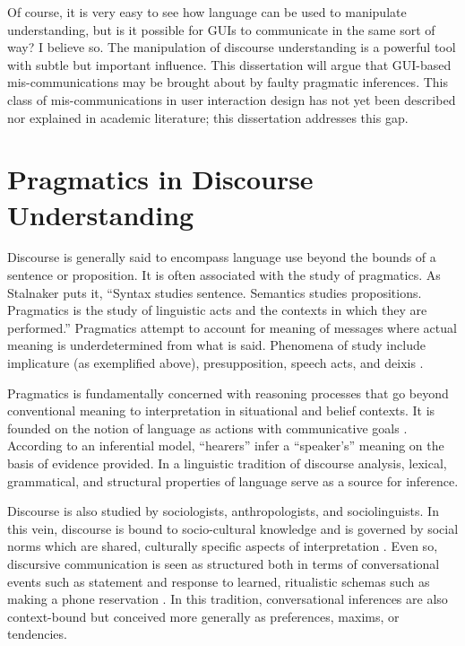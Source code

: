 Of course, it is very easy to see how language can be used to manipulate understanding, but is it possible for GUIs to communicate in the same sort of way? I believe so. The manipulation of discourse understanding is a powerful tool with subtle but important influence. This dissertation will argue that GUI-based mis-communications may be brought about by faulty pragmatic inferences. This class of mis-communications in user interaction design has not yet been described nor explained in academic literature; this dissertation addresses this gap.

\section{Pragmatics in Discourse Understanding}
\label{pragmaticsindiscourseunderstanding}

Discourse is generally said to encompass language use beyond the bounds of a sentence or proposition. It is often associated with the study of pragmatics. As Stalnaker  \citeyearpar[p. 34]{Stalnaker:1999vl}  puts it, ``Syntax studies sentence. Semantics studies propositions. Pragmatics is the study of linguistic acts and the contexts in which they are performed.'' Pragmatics attempt to account for meaning of messages where actual meaning is underdetermined from what is said. Phenomena of study include implicature (as exemplified above), presupposition, speech acts, and deixis  \citep{Huang:2007ww}.  

Pragmatics is fundamentally concerned with reasoning processes that go beyond conventional meaning to interpretation in situational and belief contexts. It is founded on the notion of language as actions with communicative goals  \citep{Grice:1975vz,Levinson:2000ud,Clark:1996tm} . According to an inferential model, ``hearers'' infer a ``speaker's'' meaning on the basis of evidence provided. In a linguistic tradition of discourse analysis, lexical, grammatical, and structural properties of language serve as a source for inference. 

Discourse is also studied by sociologists, anthropologists, and sociolinguists. In this vein, discourse is bound to socio-cultural knowledge and is governed by social norms which are shared, culturally specific aspects of interpretation  \citep{Gumperz:1982tc,Hymes:1974wr}.  Even so, discursive communication is seen as structured both in terms of conversational events such as statement and response to learned, ritualistic schemas such as making a phone reservation  \citep{Goffman:1981tm}.  In this tradition, conversational inferences are also context-bound but conceived more generally as preferences, maxims, or tendencies.

